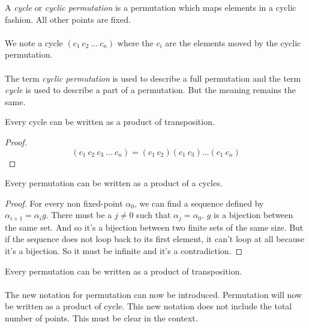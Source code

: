 \begin{definition}[Cycle]
  A \textit{cycle} or \textit{cyclic permutation} is a permutation which maps elements in a cyclic fashion. All other points are fixed.
\end{definition}

\paragraph{}
We note a cycle $(c_1\ c_2\ \dots\ c_n)$ where the $c_i$ are the elements moved by the cyclic permutation.

\paragraph{}
The term \textit{cyclic permutation} is used to describe a full permutation and the term \textit{cycle} is used to describe a part of a permutation. But the meaning remains the same.

\begin{proposition}
  Every cycle can be written as a product of transposition.
\end{proposition}

\begin{proof}
  \[
    (c_1\ c_2\ c_3\ \dots\ c_n) = (c_1\ c_2)(c_1\ c_3)\dots(c_1\ c_n)
  \]
\end{proof}

\begin{proposition}
  Every permutation can be written as a product of a cycles.
\end{proposition}

\begin{proof}
  For every non fixed-point $\alpha_0$, we can find a sequence defined by $\alpha_{i+1} = \alpha_i g$. There must be a $j \neq 0$ such that $\alpha_j = \alpha_0$. $g$ is a bijection between the same set. And so it's a bijection between two finite sets of the same size. But if the sequence does not loop back to its first element, it can't loop at all because it's a bijection. So it must be infinite and it's a contradiction.
\end{proof}

\begin{corollary}
  Every permutation can be written as a product of transposition.
\end{corollary}

\paragraph{}
The new notation for permutation can now be introduced. Permutation will now be written as a product of cycle. This new notation does not include the total number of points. This must be clear in the context.

